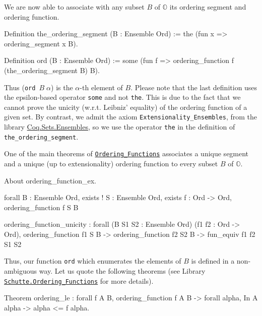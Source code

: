 \documentclass[a4paper]{book}
\begin{document}
{We are now able to associate with any subset $B$ of $\mathbb{O}$ its ordering segment and ordering function.

\begin{Coqsrc}
Definition the_ordering_segment (B : Ensemble Ord) :=
  the  (fun x => ordering_segment x B).

Definition ord  (B : Ensemble Ord) := 
  some (fun f => ordering_function f (the_ordering_segment B) B).
\end{Coqsrc}

Thus (\texttt{ord $B \;\alpha$}) is the $\alpha$-th element of $B$.
Please note that the last definition uses the epsilon-based operator \texttt{some} and
not \texttt{the}. This is due to the fact that we cannot prove the unicity (w.r.t. Leibniz' equality) of the ordering function of a given set. 
By contrast, we admit the axiom  \texttt{Extensionality\_Ensembles}, from the library 
\href{https://coq.inria.fr/distrib/current/stdlib/Coq.Sets.Ensembles.html}{Coq.Sets.Ensembles}, so we use the operator \texttt{the} in the definition of
\texttt{the\_ordering\_segment}.

One of the main theorems of
\href{../src/html/hydras.Schutte.Ordering_Functions.html\#ordering_function_ex}%
{\texttt{Ordering\_Functions}} 
associates a unique segment and a unique (up to extensionality) ordering function to every subset $B$ of $\mathbb{O}$.

\begin{Coqsrc}
About ordering_function_ex.
\end{Coqsrc}

\begin{Coqanswer}
forall B : Ensemble Ord,
 exists ! S : Ensemble Ord, 
      exists f : Ord -> Ord, ordering_function f S B
\end{Coqanswer}


\begin{Coqanswer}
ordering_function_unicity :
forall (B S1 S2 : Ensemble Ord) (f1 f2 : Ord -> Ord),
ordering_function f1 S B ->
ordering_function f2 S2 B -> 
fun_equiv f1 f2 S1 S2
\end{Coqanswer}

Thus,  our function \texttt{ord}  which enumerates the elements of $B$ is defined in a non-ambiguous way.
Let us quote the following theorems (see Library
\href{../src/html/hydras.Schutte.Ordering_Functions.html}%
{\texttt{Schutte.Ordering\_Functions}} for more details).
 

\begin{Coqsrc}
Theorem ordering_le : forall f A B,
    ordering_function f A B ->
    forall alpha, In A alpha -> alpha <= f alpha.


\end{Coqsrc}}
\end{document}
